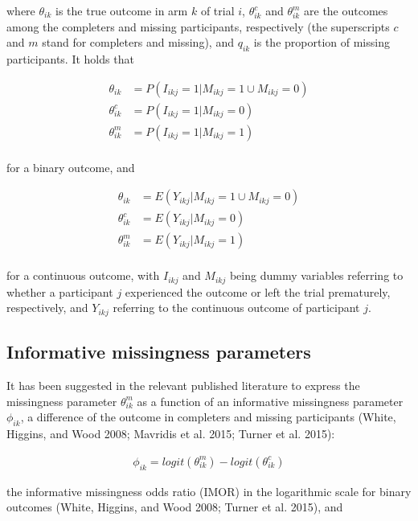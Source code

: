 where \(\theta_{ik}\) is the true outcome in arm \(k\) of trial \(i\), \(\theta^{c}_{ik}\)
and \(\theta^{m}_{ik}\) are the outcomes among the completers and missing participants,
respectively (the superscripts \(c\) and \(m\) stand for completers and missing), and
\(q_{ik}\) is the proportion of missing participants. It holds that

\[\begin{aligned}
\theta_{ik} &= P(I_{ikj} = 1 | M_{ikj} = 1 \cup M_{ikj} = 0) \\
\theta^{c}_{ik} &= P(I_{ikj} = 1 | M_{ikj} = 0) \\
\theta^{m}_{ik} &= P(I_{ikj} = 1 | M_{ikj} = 1) \\
\end{aligned}\]

for a binary outcome, and

\[\begin{aligned}
\theta_{ik} &= E(Y_{ikj} | M_{ikj} = 1 \cup M_{ikj} = 0) \\
\theta^{c}_{ik} &= E(Y_{ikj} | M_{ikj} = 0) \\
\theta^{m}_{ik} &= E(Y_{ikj} | M_{ikj} = 1) \\
\end{aligned}\]

for a continuous outcome, with \(I_{ikj}\) and \(M_{ikj}\) being dummy variables
referring to whether a participant \(j\) experienced the outcome or left the trial
prematurely, respectively, and \(Y_{ikj}\) referring to the continuous outcome of
participant \(j\).

\hypertarget{informative-missingness-parameters}{%
\subsection{Informative missingness parameters}\label{informative-missingness-parameters}}

It has been suggested in the relevant published literature to express the missingness
parameter \(\theta^{m}_{ik}\) as a function of an informative missingness parameter \(\phi_{ik}\), a difference of the outcome in completers and missing participants (White, Higgins, and Wood 2008; Mavridis et al. 2015; Turner et al. 2015):

\[\begin{aligned}
\phi_{ik} = logit(\theta^{m}_{ik}) - logit(\theta^{c}_{ik})
\end{aligned}\]

the informative missingness odds ratio (IMOR) in the logarithmic scale for binary
outcomes (White, Higgins, and Wood 2008; Turner et al. 2015), and

